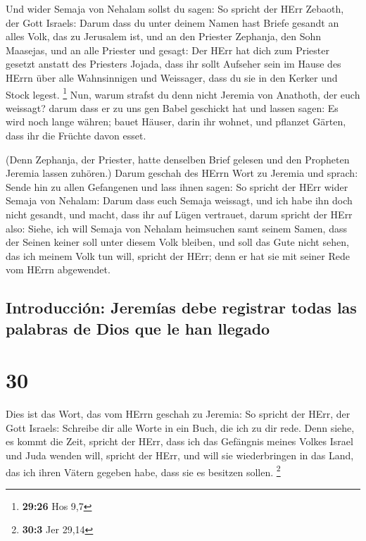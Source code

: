  Und wider Semaja von Nehalam sollst du sagen:
 So spricht der HErr Zebaoth, der Gott Israels: Darum
dass du unter deinem Namen hast Briefe gesandt an alles Volk, das zu
Jerusalem ist, und an den Priester Zephanja, den Sohn Maasejas, und an
alle Priester und gesagt:  Der HErr hat dich zum Priester
gesetzt anstatt des Priesters Jojada, dass ihr sollt Aufseher sein im
Hause des HErrn über alle Wahnsinnigen und Weissager, dass du sie in den
Kerker und Stock legest. \footnote{\textbf{29:26} Hos 9,7}
 Nun, warum strafst du denn nicht Jeremia von Anathoth,
der euch weissagt?  darum dass er zu uns gen Babel
geschickt hat und lassen sagen: Es wird noch lange währen; bauet Häuser,
darin ihr wohnet, und pflanzet Gärten, dass ihr die Früchte davon esset.

 (Denn Zephanja, der Priester, hatte denselben Brief
gelesen und den Propheten Jeremia lassen zuhören.)  Darum
geschah des HErrn Wort zu Jeremia und sprach:  Sende hin
zu allen Gefangenen und lass ihnen sagen: So spricht der HErr wider
Semaja von Nehalam: Darum dass euch Semaja weissagt, und ich habe ihn
doch nicht gesandt, und macht, dass ihr auf Lügen vertrauet,
 darum spricht der HErr also: Siehe, ich will Semaja von
Nehalam heimsuchen samt seinem Samen, dass der Seinen keiner soll unter
diesem Volk bleiben, und soll das Gute nicht sehen, das ich meinem Volk
tun will, spricht der HErr; denn er hat sie mit seiner Rede vom HErrn
abgewendet.

\hypertarget{introducciuxf3n-jeremuxedas-debe-registrar-todas-las-palabras-de-dios-que-le-han-llegado}{%
\subsection{Introducción: Jeremías debe registrar todas las palabras de
Dios que le han
llegado}\label{introducciuxf3n-jeremuxedas-debe-registrar-todas-las-palabras-de-dios-que-le-han-llegado}}

\hypertarget{section-29}{%
\section{30}\label{section-29}}

 Dies ist das Wort, das vom HErrn geschah zu Jeremia:
 So spricht der HErr, der Gott Israels: Schreibe dir alle
Worte in ein Buch, die ich zu dir rede.  Denn siehe, es
kommt die Zeit, spricht der HErr, dass ich das Gefängnis meines Volkes
Israel und Juda wenden will, spricht der HErr, und will sie
wiederbringen in das Land, das ich ihren Vätern gegeben habe, dass sie
es besitzen sollen. \footnote{\textbf{30:3} Jer 29,14}

